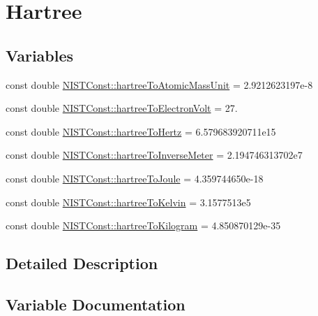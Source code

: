 \hypertarget{group___hartree}{}\section{Hartree}
\label{group___hartree}
\subsection*{Variables}
\begin{DoxyCompactItemize}
\item 
const double \hyperlink{group___hartree_gafc823cd4d405fbad0af7abf03a28917d}{N\+I\+S\+T\+Const\+::hartree\+To\+Atomic\+Mass\+Unit} = 2.\+9212623197e-\/8
\item 
const double \hyperlink{group___hartree_ga225406ee0c3f44db3c49563e7dd253ce}{N\+I\+S\+T\+Const\+::hartree\+To\+Electron\+Volt} = 27.
\item 
const double \hyperlink{group___hartree_gaf2341e65d7aba07555272afe4a14345e}{N\+I\+S\+T\+Const\+::hartree\+To\+Hertz} = 6.\+579683920711e15
\item 
const double \hyperlink{group___hartree_ga98d22d0957c639e03a8432aadd02f58f}{N\+I\+S\+T\+Const\+::hartree\+To\+Inverse\+Meter} = 2.\+194746313702e7
\item 
const double \hyperlink{group___hartree_ga0c47e6885cdf30ceb56ac3c9420cb81c}{N\+I\+S\+T\+Const\+::hartree\+To\+Joule} = 4.\+359744650e-\/18
\item 
const double \hyperlink{group___hartree_ga5468b69d29f43719e4642f9c5248e546}{N\+I\+S\+T\+Const\+::hartree\+To\+Kelvin} = 3.\+1577513e5
\item 
const double \hyperlink{group___hartree_ga1184624f36892653b10c2bb068541f82}{N\+I\+S\+T\+Const\+::hartree\+To\+Kilogram} = 4.\+850870129e-\/35
\end{DoxyCompactItemize}


\subsection{Detailed Description}


\subsection{Variable Documentation}
\mbox{\label{group___hartree_gafc823cd4d405fbad0af7abf03a28917d}} 

